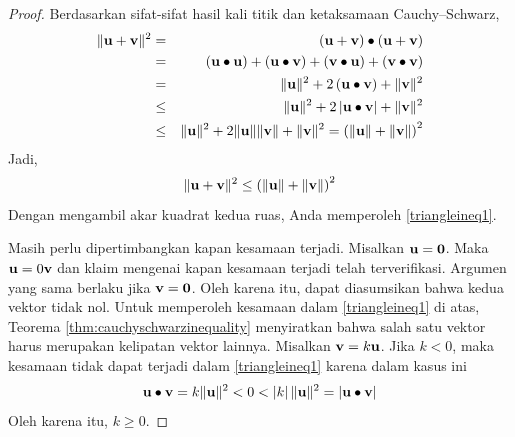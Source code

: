\ifdefined\showproofs
\begin{proof} Berdasarkan sifat-sifat hasil kali titik dan ketaksamaan Cauchy--Schwarz,
\begin{eqnarray*}
\| \mathbf{u}+\mathbf{v}\| ^{2} &=& \left( \mathbf{u}+\mathbf{v}\right) \bullet \left( \mathbf{u}+\mathbf{v}\right) \\
& =&\left( \mathbf{u}\bullet \mathbf{u}\right) +\left( \mathbf{u}\bullet \mathbf{v}\right) +\left(\mathbf{v}\bullet \mathbf{u}\right) +\left( \mathbf{v}\bullet \mathbf{v}\right) \\
&=&\| \mathbf{u}\| ^{2}+2\left( \mathbf{u}\bullet \mathbf{v}\right)+\| \mathbf{v}\| ^{2} \\
&\leq& \| \mathbf{u}\| ^{2}+2\left\vert \mathbf{u}\bullet \mathbf{v}\right\vert +\| \mathbf{v}\| ^{2} \\
&\leq& \| \mathbf{u}\| ^{2}+2\| \mathbf{u}\| \| \mathbf{v}\| +\| \mathbf{v}\| ^{2} =\left( \| \mathbf{u}\| +\| \mathbf{v}\|\right) ^{2}
\end{eqnarray*}
Jadi,
\begin{equation*}
\| \mathbf{u}+\mathbf{v}\| ^{2} \leq \left( \| \mathbf{u}\| +\| \mathbf{v}\|
\right) ^{2}
\end{equation*}
Dengan mengambil akar kuadrat kedua ruas, Anda memperoleh \ref{triangleineq1}.

Masih perlu dipertimbangkan kapan kesamaan terjadi. Misalkan $\mathbf{u} = \mathbf{0}$.
Maka $\mathbf{u} = 0 \mathbf{v}$ dan klaim mengenai kapan
kesamaan terjadi telah terverifikasi. Argumen yang sama berlaku jika $\mathbf{v} = \mathbf{0}$.
Oleh karena itu, dapat diasumsikan bahwa kedua vektor
tidak nol. Untuk memperoleh kesamaan dalam \ref{triangleineq1} di atas, Teorema \ref{thm:cauchyschwarzinequality}
menyiratkan bahwa salah satu vektor harus merupakan kelipatan
vektor lainnya. Misalkan $\mathbf{v}= k \mathbf{u}$. Jika $k <0$, maka kesamaan
tidak dapat terjadi dalam \ref{triangleineq1} karena dalam kasus ini
\begin{equation*}
\mathbf{u}\bullet \mathbf{v} =k \| \mathbf{u}\|
^{2}<0<\left| k \right| \| \mathbf{u}\| ^{2}=\left| \mathbf{u}\bullet \mathbf{v}\right|
\end{equation*}
Oleh karena itu, $k \geq 0.$


\end{proof}

